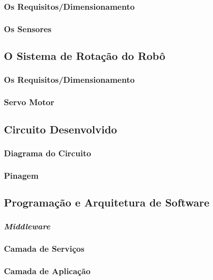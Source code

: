       \subsubsection{Os Requisitos/Dimensionamento}
      \subsubsection{Os Sensores}
    \subsection{O Sistema de Rotação do Robô}
      \subsubsection{Os Requisitos/Dimensionamento}
      \subsubsection{Servo Motor}
    \subsection{Circuito Desenvolvido}
      \subsubsection{Diagrama do Circuito}
      \subsubsection{Pinagem}
    \subsection{Programação e Arquitetura de Software}
      \subsubsection{\textit{Middleware}}
      \subsubsection{Camada de Serviços}
      \subsubsection{Camada de Aplicação}
  

